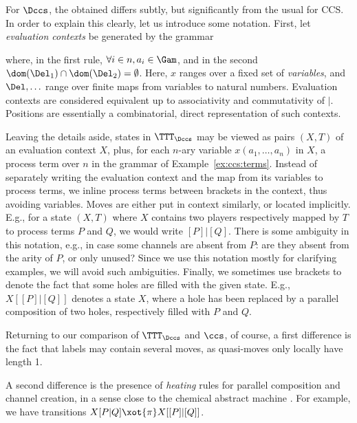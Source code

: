 \documentclass{LMCS}
\theoremstyle{plain}\newtheorem{satz}[thm]{Satz}
\begin{document}
\begin{exa}\label{ex:ltsccs}
  For $\Dccs$, the obtained \lts{} differs subtly, but significantly
  from the usual \lts{} for CCS. In order to explain this clearly, let
  us introduce some notation. First, let \emph{evaluation contexts} be
  generated by the grammar
  where, in the first rule, $\forall i \in n,a_i \in \Gam$, and in the
  second $\dom (\Del_1) \cap \dom (\Del_2) = \emptyset$.  Here, $x$
  ranges over a fixed set of \emph{variables}, and $\Del, \ldots$
  range over finite maps from variables to natural numbers. Evaluation
  contexts are considered equivalent up to associativity and
  commutativity of $|$.  Positions are essentially a combinatorial,
  direct representation of such contexts.

  Leaving the details aside, states in $\TTT_{\Dccs}$ may be viewed as
  pairs $(X, T)$ of an evaluation context $X$, plus, for each $n$-ary
  variable $x (a_1, \ldots, a_n)$ in $X$, a process term over $n$ in
  the grammar of Example~\ref{ex:ccs:terms}.  Instead of separately
  writing the evaluation context and the map from its variables to
  process terms, we inline process terms between brackets in the
  context, thus avoiding variables. Moves are either put in context
  similarly, or located implicitly. E.g., for a state $(X,T)$ where
  $X$ contains two players respectively mapped by $T$ to process terms
  $P$ and $Q$, we would write $[P]|[Q]$. There is some ambiguity in
  this notation, e.g., in case some channels are absent from $P$: are
  they absent from the arity of $P$, or only unused? Since we use this
  notation mostly for clarifying examples, we will avoid such
  ambiguities.  Finally, we sometimes use brackets to denote the fact
  that some holes are filled with the given state. E.g., $X[[P]|[Q]]$
  denotes a state $X$, where a hole has been replaced by a parallel
  composition of two holes, respectively filled with $P$ and $Q$.

  Returning to our comparison of $\TTT_{\Dccs}$ and $\ccs$, of course,
  a first difference is the fact that labels may contain several
  moves, as quasi-moves only locally have length 1.

  A second difference is the presence of \emph{heating} rules for
  parallel composition and channel creation, in a sense close to the
  chemical abstract machine \citep{DBLP:conf/popl/BerryB90}.  For
  example, we have transitions $X[P | Q] \xot{\pi} X[[P]|[Q]]$.


\end{exa}
\end{document}
